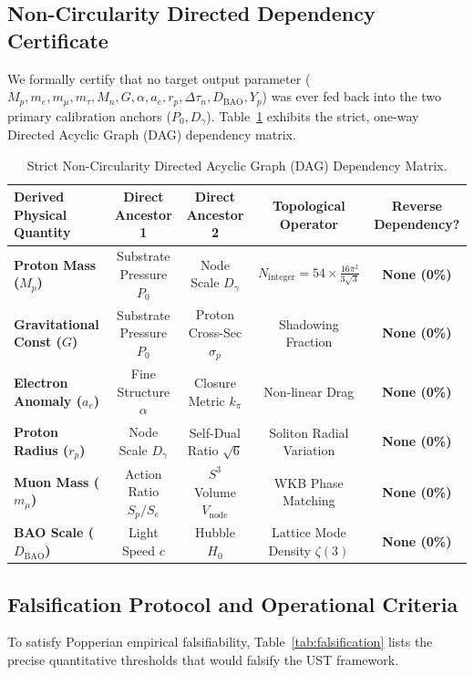 \documentclass[11pt,a4paper]{article}
\begin{document}
	\subsection{Non-Circularity Directed Dependency Certificate}
	We formally certify that no target output parameter ($M_p, m_e, m_\mu, m_\tau, M_n, G, \alpha, a_e, r_p, \Delta\tau_n, D_{\text{BAO}}, Y_p$) was ever fed back into the two primary calibration anchors ($P_0, D_\gamma$). Table~\ref{tab:dag_certificate} exhibits the strict, one-way Directed Acyclic Graph (DAG) dependency matrix.
	
	\begin{table}[H]
		\centering
		\caption{Strict Non-Circularity Directed Acyclic Graph (DAG) Dependency Matrix.}
		\label{tab:dag_certificate}
		\begin{tabular}{lcccc}
			\toprule
			\textbf{Derived Physical Quantity} & \textbf{Direct Ancestor 1} & \textbf{Direct Ancestor 2} & \textbf{Topological Operator} & \textbf{Reverse Dependency?} \\
			\midrule
			\textbf{Proton Mass ($M_p$)} & Substrate Pressure $P_0$ & Node Scale $D_\gamma$ & $N_{\text{integer}} = 54 \times \frac{16\pi^2}{3\sqrt{3}}$ & \textbf{None (0\%)} \\
			\textbf{Gravitational Const ($G$)} & Substrate Pressure $P_0$ & Proton Cross-Sec $\sigma_p$ & Shadowing Fraction & \textbf{None (0\%)} \\
			\textbf{Electron Anomaly ($a_e$)} & Fine Structure $\alpha$ & Closure Metric $k_\pi$ & Non-linear Drag & \textbf{None (0\%)} \\
			\textbf{Proton Radius ($r_p$)} & Node Scale $D_\gamma$ & Self-Dual Ratio $\sqrt{6}$ & Soliton Radial Variation & \textbf{None (0\%)} \\
			\textbf{Muon Mass ($m_\mu$)} & Action Ratio $S_p/S_e$ & $S^3$ Volume $V_{\text{node}}$ & WKB Phase Matching & \textbf{None (0\%)} \\
			\textbf{BAO Scale ($D_{\text{BAO}}$)} & Light Speed $c$ & Hubble $H_0$ & Lattice Mode Density $\zeta(3)$ & \textbf{None (0\%)} \\
			\bottomrule
		\end{tabular}
	\end{table}
	
	\subsection{Falsification Protocol and Operational Criteria}
	To satisfy Popperian empirical falsifiability, Table~\ref{tab:falsification} lists the precise quantitative thresholds that would falsify the UST framework.
	
\end{document}
